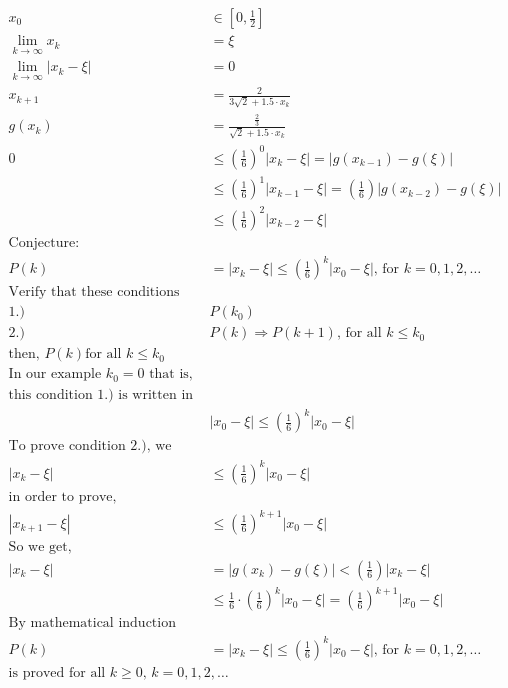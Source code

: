 \documentclass{article}
\begin{document}
\begin{align*}
     x_0 &\in \left[0, \frac{1}{2} \right]\\
     \lim_{k \to \infty} x_k&= \xi\\
     \lim_{k \to \infty} |x_k - \xi|&= 0\\
     x_{k+1} &= \frac{2}{3\sqrt{2}+1.5\cdot x_k} \\
     g(x_k) &= \frac{\frac{2}{3}}{\sqrt{2}+1.5\cdot x_k}\\
     0 &\le \left(\frac{1}{6} \right)^0 |x_k-\xi|= |g(x_{k-1})-g(\xi)|\\
     & \le \left(\frac{1}{6} \right)^1|x_{k-1}-\xi|= \left(\frac{1}{6} \right)|g(x_{k-2})-g(\xi)| \\
     &\le \left(\frac{1}{6} \right)^2 |x_{k-2}-\xi|\\
     \text{Conjecture:}\\
     P(k) &= |x_k-\xi| \le \left(\frac{1}{6} \right)^k|x_0-\xi| \text{, for }k=0,1,2,\dots\\
     \text{Verify that these conditions are true:}&\\
     1.)&P(k_0)\\
     2.)&P(k) \Rightarrow P(k+1)\text{, for all }k \le k_0\\
     \text{then, $P(k)$for all }k \le k_0\\
     \text{In our example }k_0=0 \text{ that is,}\\
     \text{this condition 1.) is written in the form,}\\
     &|x_0-\xi| \le \left(\frac{1}{6} \right)^k|x_0-\xi|\\
     \text{To prove condition 2.), we assume that,}&\\
     |x_{k}-\xi|&\le \left(\frac{1}{6} \right)^{k}|x_0-\xi|\\
     \text{in order to prove,}\\
     |x_{k+1}-\xi|&\le \left(\frac{1}{6} \right)^{k+1}|x_0-\xi|\\
     \text{So we get,}&\\
     |x_{k}-\xi|&=|g(x_k)-g(\xi)| < \left(\frac{1}{6} \right)|x_k-\xi|\\
     & \le \frac{1}{6}\cdot \left(\frac{1}{6} \right)^k|x_0-\xi|= \left(\frac{1}{6} \right)^{k+1}|x_0-\xi|\\
     \text{By mathematical induction the conjecture}&\\
     P(k) &= |x_k-\xi| \le \left(\frac{1}{6} \right)^k|x_0-\xi| \text{, for }k=0,1,2,\dots\\
     \text{is proved for all $k \ge 0$, }k=0,1,2,\dots &\\

\end{align*}
\end{document}
